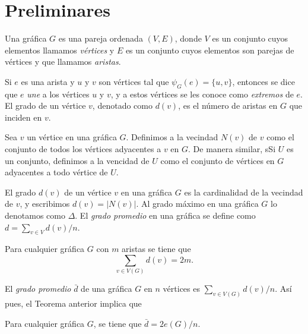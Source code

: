 
\section{Preliminares}
\begin{definition}
  Una gráfica $G$ es una pareja ordenada $(V, E)$, donde $V$
  es un conjunto cuyos elementos llamamos \textit{vértices} y $E$ es
  un conjunto cuyos elementos son parejas de vértices y que llamamos
  \textit{aristas}.
\end{definition}

Si $e$ es una arista y $u$ y $v$ son vértices tal que $\psi_G(e)
= \{u, v\}$, entonces se dice que $e$ \textit{une} a los vértices
$u$ y $v$, y a estos vértices se les conoce como \textit{extremos} de $e$.
El grado de un vértice $v$, denotado como $d(v)$, es el número de
aristas en $G$ que inciden en $v$.

\begin{definition}
  Sea $v$ un vértice en una gráfica $G$. Definimos a la vecindad
  $N(v)$ de $v$ como el conjunto de todos los vértices adyacentes a
  $v$ en $G$. De
  manera similar, sSi $U$ es un conjunto, definimos a la vencidad de $U$ como
  el conjunto de vértices en $G$ adyacentes a todo vértice de $U$.
\end{definition}

\begin{definition}
  El grado $d(v)$ de un vértice $v$ en una gráfica $G$ es la
  cardinalidad de la vecindad de $v$, y escribimos
  $d(v) = \vert N(v) \vert$. Al grado máximo en una gráfica $G$ lo
  denotamos como $\Delta$. El \textit{grado promedio} en una gráfica
  se define como $d = \sum_{v \in V} d(v) / n$.
\end{definition}

\begin{theorem} Para cualquier gráfica $G$ con $m$
  aristas se tiene que
  $$\sum_{v \in V(G)} d(v) = 2m.$$
\end{theorem}
El \textit{grado promedio} $\bar{d}$ de una gráfica $G$ en $n$
vértices es $\sum_{ v
\in V(G)} d(v) / n$. Así pues, el Teorema anterior implica que

\begin{corollary}
  Para cualquier gráfica $G$, se tiene que $\bar{d} = 2 e(G) /n.$
\end{corollary}

